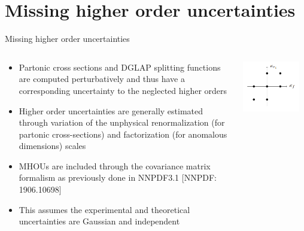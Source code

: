 \documentclass[aspectratio=169, 8pt,t]{beamer}
\begin{document}

\section*{Missing higher order uncertainties}

\begin{frame}{Missing higher order uncertainties}
  \begin{columns}[T]
    \begin{column}{0.49\textwidth}
      \begin{itemize}
        \item Partonic cross sections and DGLAP splitting functions are computed perturbatively and thus have a corresponding uncertainty to the neglected higher orders
        \item Higher order uncertainties are generally estimated through variation of the unphysical renormalization (for partonic cross-sections) and factorization (for anomalous dimensions) scales
        \item MHOUs are included through the covariance matrix formalism as previously done in NNPDF3.1 {\color{gray} [NNPDF: 1906.10698]}
        \item This assumes the experimental and theoretical uncertainties are Gaussian and independent
      \end{itemize}
    \end{column}
    \begin{column}{0.49\textwidth}
      \includegraphics[width=0.89\textwidth]{figures/7ptsv.png}
    \end{column}
  \end{columns}
\end{frame}
\end{document}
